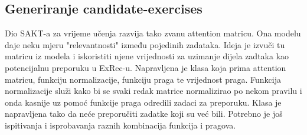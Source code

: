 		\subsection{Generiranje candidate-exercises}
		Dio SAKT-a za vrijeme učenja razvija tako zvanu attention matricu. Ona modelu daje neku mjeru "relevantnosti" između pojedinih zadataka. Ideja je izvuči tu matricu iz modela i iskoristiti njene vrijednosti za uzimanje dijela zadtaka kao potencijalnu preporuku u ExRec-u. Napravljena je klasa koja prima attention matricu, funkciju normalizacije, funkciju praga te vrijednost praga. Funkcija normalizacije služi kako bi se svaki redak matrice normalizirao po nekom pravilu i onda kasnije uz pomoć funkcije praga odredili zadaci za preporuku. Klasa je napravljena tako da neće preporučiti zadatke koji su već bili. Potrebno je još ispitivanja i isprobavanja raznih kombinacija funkcija i pragova.
		
